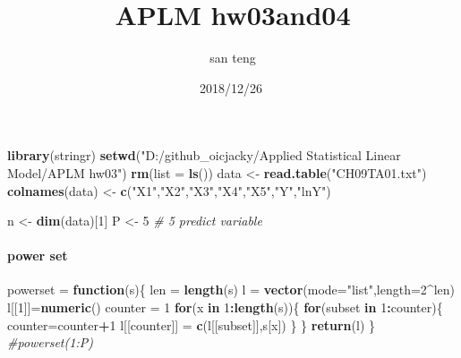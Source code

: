 \documentclass[]{article}
\title{APLM hw03and04}
\author{san teng}
\date{2018/12/26}
\newenvironment{Shaded}{\begin{snugshade}}{\end{snugshade}}
\newcommand{\KeywordTok}[1]{\textcolor[rgb]{0.13,0.29,0.53}{\textbf{#1}}}
\newcommand{\DataTypeTok}[1]{\textcolor[rgb]{0.13,0.29,0.53}{#1}}
\newcommand{\DecValTok}[1]{\textcolor[rgb]{0.00,0.00,0.81}{#1}}
\newcommand{\StringTok}[1]{\textcolor[rgb]{0.31,0.60,0.02}{#1}}
\newcommand{\CommentTok}[1]{\textcolor[rgb]{0.56,0.35,0.01}{\textit{#1}}}
\newcommand{\ControlFlowTok}[1]{\textcolor[rgb]{0.13,0.29,0.53}{\textbf{#1}}}
\newcommand{\OperatorTok}[1]{\textcolor[rgb]{0.81,0.36,0.00}{\textbf{#1}}}
\newcommand{\NormalTok}[1]{#1}
\let\oldparagraph\paragraph
\renewcommand{\paragraph}[1]{\oldparagraph{#1}\mbox{}}
\begin{document}
\maketitle

\begin{Shaded}
\begin{Highlighting}[]
\KeywordTok{library}\NormalTok{(stringr)}
\KeywordTok{setwd}\NormalTok{(}\StringTok{"D:/github_oicjacky/Applied Statistical Linear Model/APLM hw03"}\NormalTok{)}
\KeywordTok{rm}\NormalTok{(}\DataTypeTok{list =} \KeywordTok{ls}\NormalTok{())}
\NormalTok{data <-}\StringTok{ }\KeywordTok{read.table}\NormalTok{(}\StringTok{"CH09TA01.txt"}\NormalTok{)}
\KeywordTok{colnames}\NormalTok{(data) <-}\StringTok{ }\KeywordTok{c}\NormalTok{(}\StringTok{"X1"}\NormalTok{,}\StringTok{"X2"}\NormalTok{,}\StringTok{"X3"}\NormalTok{,}\StringTok{"X4"}\NormalTok{,}\StringTok{"X5"}\NormalTok{,}\StringTok{"Y"}\NormalTok{,}\StringTok{"lnY"}\NormalTok{)}

\NormalTok{n <-}\StringTok{ }\KeywordTok{dim}\NormalTok{(data)[}\DecValTok{1}\NormalTok{]}
\NormalTok{P <-}\StringTok{ }\DecValTok{5}            \CommentTok{# 5 predict variable}
\end{Highlighting}
\end{Shaded}

\paragraph{power set}\label{power-set}

\begin{Shaded}
\begin{Highlighting}[]
\NormalTok{powerset =}\StringTok{ }\ControlFlowTok{function}\NormalTok{(s)\{}
\NormalTok{  len =}\StringTok{ }\KeywordTok{length}\NormalTok{(s)}
\NormalTok{  l =}\StringTok{ }\KeywordTok{vector}\NormalTok{(}\DataTypeTok{mode=}\StringTok{"list"}\NormalTok{,}\DataTypeTok{length=}\DecValTok{2}\OperatorTok{^}\NormalTok{len) }
\NormalTok{  l[[}\DecValTok{1}\NormalTok{]]=}\KeywordTok{numeric}\NormalTok{()}
\NormalTok{  counter =}\StringTok{ }\DecValTok{1}
  \ControlFlowTok{for}\NormalTok{(x }\ControlFlowTok{in} \DecValTok{1}\OperatorTok{:}\KeywordTok{length}\NormalTok{(s))\{}
    \ControlFlowTok{for}\NormalTok{(subset }\ControlFlowTok{in} \DecValTok{1}\OperatorTok{:}\NormalTok{counter)\{}
\NormalTok{      counter=counter}\OperatorTok{+}\DecValTok{1}
\NormalTok{      l[[counter]] =}\StringTok{ }\KeywordTok{c}\NormalTok{(l[[subset]],s[x])}
\NormalTok{    \}}
\NormalTok{  \}}
  \KeywordTok{return}\NormalTok{(l)}
\NormalTok{\}}
\CommentTok{#powerset(1:P)}
\end{Highlighting}
\end{Shaded}
\end{document}
